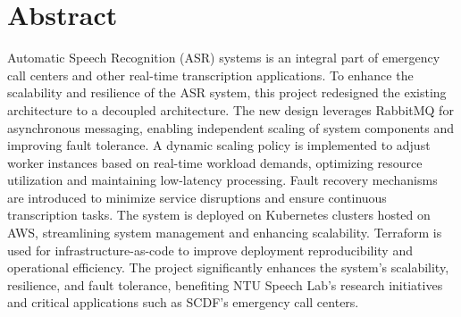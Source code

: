 \chapter*{Abstract}

Automatic Speech Recognition (ASR) systems is an integral part of emergency call centers and other real-time transcription applications. To enhance the scalability and resilience of the ASR system, this project redesigned the existing architecture to a decoupled architecture. The new design leverages RabbitMQ for asynchronous messaging, enabling independent scaling of system components and improving fault tolerance. A dynamic scaling policy is implemented to adjust worker instances based on real-time workload demands, optimizing resource utilization and maintaining low-latency processing. Fault recovery mechanisms are introduced to minimize service disruptions and ensure continuous transcription tasks. The system is deployed on Kubernetes clusters hosted on AWS, streamlining system management and enhancing scalability. Terraform is used for infrastructure-as-code to improve deployment reproducibility and operational efficiency. The project significantly enhances the system's scalability, resilience, and fault tolerance, benefiting NTU Speech Lab's research initiatives and critical applications such as SCDF's emergency call centers.

